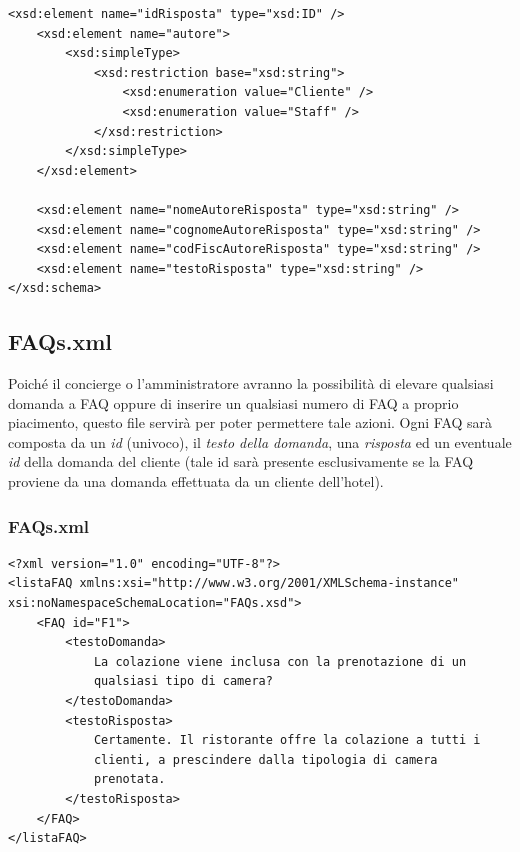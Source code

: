 \documentclass [a4paper, 12pt]{book}
\begin{document}
\begin{lstlisting}[style=XML]
    <xsd:element name="idRisposta" type="xsd:ID" />
    <xsd:element name="autore">
        <xsd:simpleType>
            <xsd:restriction base="xsd:string">
                <xsd:enumeration value="Cliente" />
                <xsd:enumeration value="Staff" />
            </xsd:restriction>
        </xsd:simpleType>
    </xsd:element>

    <xsd:element name="nomeAutoreRisposta" type="xsd:string" />
    <xsd:element name="cognomeAutoreRisposta" type="xsd:string" />
    <xsd:element name="codFiscAutoreRisposta" type="xsd:string" />
    <xsd:element name="testoRisposta" type="xsd:string" />
</xsd:schema>
\end{lstlisting}

\subsection{FAQs.xml}
Poiché il concierge o l'amministratore avranno la possibilità di elevare qualsiasi domanda a FAQ oppure di inserire un qualsiasi numero di FAQ a proprio piacimento, questo file servirà per poter permettere tale azioni. Ogni FAQ sarà composta da un \textit{id} (univoco), il \textit{testo della domanda}, una \textit{risposta} ed un eventuale \textit{id} della domanda del cliente (tale id sarà presente esclusivamente se la FAQ proviene da una domanda effettuata da un cliente dell'hotel).

\subsubsection{FAQs.xml}
\begin{lstlisting}[style=XML]
<?xml version="1.0" encoding="UTF-8"?>
<listaFAQ xmlns:xsi="http://www.w3.org/2001/XMLSchema-instance" xsi:noNamespaceSchemaLocation="FAQs.xsd">
    <FAQ id="F1">
        <testoDomanda>
            La colazione viene inclusa con la prenotazione di un
            qualsiasi tipo di camera?
        </testoDomanda>
        <testoRisposta>
            Certamente. Il ristorante offre la colazione a tutti i
            clienti, a prescindere dalla tipologia di camera
            prenotata.
        </testoRisposta>
    </FAQ>
</listaFAQ>
\end{lstlisting}
\end{document}
